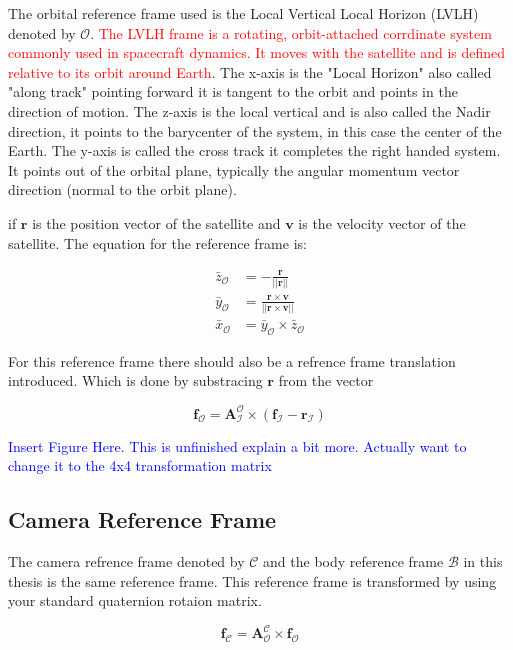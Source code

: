 The orbital reference frame used is the Local Vertical Local Horizon (LVLH) denoted by $\mathcal{O}$. \textcolor{red}{The LVLH frame is a rotating, orbit-attached corrdinate
system commonly used in spacecraft dynamics. It moves with the satellite and is defined relative to its orbit around Earth}. The x-axis is the "Local Horizon" also called
"along track" pointing forward it is tangent to the orbit and points in the direction of motion. The z-axis is the local vertical and is also called the Nadir direction, it points
to the barycenter of the system, in this case the center of the Earth. The y-axis is called the cross track it completes the right handed system. It points out of the orbital plane,
typically the angular momentum vector direction (normal to the orbit plane).

if $\mathbf{r}$ is the position vector of the satellite and $\mathbf{v}$ is the velocity vector of the satellite.
The equation for the reference frame is:

\begin{align}
    \bar{z}_{\mathcal{O}} &= -\frac{\mathbf{r}}{||\mathbf{r}||} \\
    \bar{y}_{\mathcal{O}} &= \frac{\mathbf{r}\times\mathbf{v}}{||\mathbf{r}\times\mathbf{v}||}\\
    \bar{x}_{\mathcal{O}} &= \bar{y}_{\mathcal{O}}\times\bar{z}_{\mathcal{O}}
\end{align}

For this reference frame there should also be a refrence frame translation introduced. Which is done by substracing $\mathbf{r}$ from the vector

\begin{equation}
    \mathbf{f}_{\mathcal{O}} = \mathbf{A}_{\mathcal{I}}^{\mathcal{O}}\times(\mathbf{f}_{\mathcal{I}} - \mathbf{r}_{\mathcal{I}})
\end{equation}

\textcolor{blue}{Insert Figure Here. This is unfinished explain a bit more. Actually want to change it to the 4x4 transformation matrix}

\subsection{Camera Reference Frame}

The camera refrence frame denoted by $\mathcal{C}$ and the body reference frame $\mathcal{B}$ in this thesis is the same reference frame. This reference frame is transformed
by using your standard quaternion rotaion matrix.

\begin{equation}
    \mathbf{f}_{\mathcal{C}} = \mathbf{A}_{\mathcal{O}}^{\mathcal{C}}\times\mathbf{f}_{\mathcal{O}}
\end{equation}



\label{sec:modrec}

\label{sec:modconclusion}